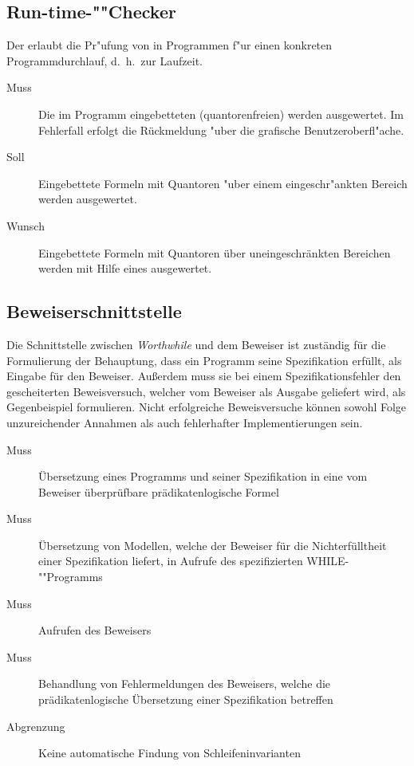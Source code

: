 \subsection{Run-time-""Checker}%

Der  erlaubt die Pr"ufung von  in Programmen f"ur einen konkreten Programmdurchlauf, d.~h.\ zur Laufzeit.%

\begin{description}%
    \item [Muss] Die im Programm eingebetteten (quantorenfreien)  werden ausgewertet. Im Fehlerfall erfolgt die Rückmeldung "uber die grafische Benutzeroberfl"ache.
    \item [Soll] Eingebettete Formeln mit Quantoren "uber einem eingeschr"ankten Bereich werden ausgewertet.%
    \item [Wunsch] Eingebettete Formeln mit Quantoren über uneingeschränkten Bereichen werden mit Hilfe eines  ausgewertet.
\end{description}%

\subsection{Beweiserschnittstelle}%

Die Schnittstelle zwischen \textit{Worthwhile} und dem Beweiser ist zuständig für die Formulierung der Behauptung, dass ein Programm seine Spezifikation erfüllt, als Eingabe für den Beweiser. Außerdem muss sie bei einem Spezifikationsfehler den gescheiterten Beweisversuch, welcher vom Beweiser als Ausgabe geliefert wird, als Gegenbeispiel formulieren. Nicht erfolgreiche Beweisversuche können sowohl Folge unzureichender Annahmen als auch fehlerhafter Implementierungen sein.%

\begin{description}%
    \item [Muss] Übersetzung eines Programms und seiner Spezifikation in eine vom Beweiser überprüfbare prädikatenlogische Formel
    \item [Muss] Übersetzung von Modellen, welche der Beweiser für die Nichterfülltheit einer Spezifikation liefert, in Aufrufe des spezifizierten WHILE-""Programms%
    \item [Muss] Aufrufen des Beweisers
    \item [Muss] Behandlung von Fehlermeldungen des Beweisers, welche die prädikatenlogische Übersetzung einer Spezifikation betreffen%
    \item [Abgrenzung] Keine automatische Findung von Schleifeninvarianten
\end{description}%

